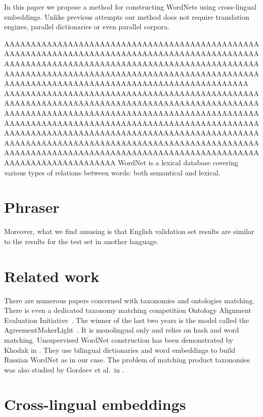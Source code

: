 \documentclass[11pt,a4paper]{article}
\begin{document}
In this paper we propose a method for constructing WordNets using cross-lingual embeddings. Unlike previous attempts our method does not require translation engines, parallel dictionaries or even parallel corpora.

AAAAAAAAAAAAAAAAAAAAAAAAAAAAAAAAAAAAAAAAAAAAAAAAAAAAAAAAAAAAAAAAAAAAAAAAAAAAAAAAAAAAAAAAAAAAAAAAAAAAAAAAAAAAAAAAAAAAAAAAAAAAAAAAAAAAAAAAAAAAAAAAAAAAAAAAAAAAAAAAAAAAAAAAAAAAAAAAAAAAAAAAAAAAAAAAAAAAAAAAAAAAAAAAAAAAAAAAAAAAAAAAAAAAAAAAAAAAAA
AAAAAAAAAAAAAAAAAAAAAAAAAAAAAAAAAAAAAAAAAAAAAAAAAAAAAAAAAAAAAAAAAAAAAAAAAAAAAAAAAAAAAAAAAAAAAAAAAAAAAAAAAAAAAAAAAAAAAAAAAAAAAAAAAAAAAAAAAAAAAAAAAAAAAAAAAAAAAAAAAAAAAAAAAAAAAAAAAAAAAAAAAAAAAAAAAAAAAAAAAAAAAAAAAAAAAAAAAAAAAAAAAAAAAAAAAAAAAAAAAAAAAAAAAAAAAAAAAAAAAAAAAAAAAAAAAAAAAAAAAAAAAAAAAAAAAAAAAAAAAAAAAAAAAAAAAAAAAAAAAAAAAAAAAAAAAAAAAAAAAAAAAAAAAAAAAAAAA
WordNet\cite{wordnet} is a lexical database covering various types of relations between words: both semantical and lexical. 

\section{Phraser}
Moreover, what we find amusing is that English validation set results are similar to the results for the test set in another language.

\section{Related work}
There are numerous papers concerned with taxonomies and ontologies matching. There is even a dedicated taxonomy matching competition Ontology Alignment Evaluation Initiative~\cite{ontology-sota}. The winner of the last two years is the model called the AgreementMakerLight~\cite{faria}. It is monolingual only and relies on hash and word matching. Unsupervised WordNet construction has been demonstrated by Khodak in \citeyearpar{Khodak2017}. They use bilingual dictionaries and word embeddings to build Russian WordNet as in our case. The problem of matching product taxonomies was also studied by Gordeev et al.\ in \citeyearpar{gordeev-fruct}.

\section{Cross-lingual embeddings}
\end{document}
